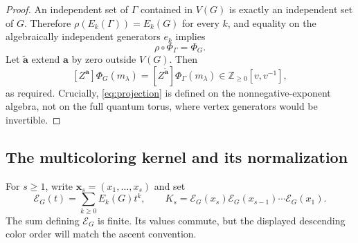 \documentclass[11pt]{article}
\theoremstyle{remark}
\newcommand{\NN}{\mathbb Z_{\geq 0}}
\newcommand{\xx}{\mathbf x}
\newcommand{\avec}{\mathbf a}
\numberwithin{equation}{section}
\begin{document}
\begin{proof}
An independent set of $\Gamma$ contained in $V(G)$ is exactly an
independent set of $G$. Therefore
$\rho(E_k(\Gamma))=E_k(G)$ for every $k$, and equality on the
algebraically independent generators $e_k$ implies
\begin{equation}\label{eq:intertwining}
 \rho\circ\Phi_\Gamma=\Phi_G.
\end{equation}
Let $\widetilde{\avec}$ extend $\avec$ by zero outside $V(G)$. Then
\[
 [Z^{\avec}]\Phi_G(m_\lambda)
   =[Z^{\widetilde{\avec}}]\Phi_\Gamma(m_\lambda)
   \in\NN[v,v^{-1}],
\]
as required. Crucially, \eqref{eq:projection} is defined on the
nonnegative-exponent algebra, not on the full quantum torus, where
vertex generators would be invertible.
\end{proof}

\subsection{The multicoloring kernel and its normalization}
For $s\geq1$, write $\xx_s=(x_1,\ldots,x_s)$ and set
\begin{equation}\label{eq:kernel}
 \mathcal E_G(t)=\sum_{k\geq0}E_k(G)t^k,
 \qquad
 K_s=\mathcal E_G(x_s)\mathcal E_G(x_{s-1})\cdots
                       \mathcal E_G(x_1).
\end{equation}
The sum defining $\mathcal E_G$ is finite. Its values commute, but the
displayed descending color order will match the ascent convention.
\end{document}
